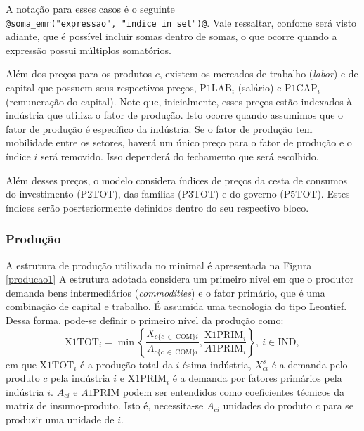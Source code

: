 \documentclass[12pt,twoside]{article}
\begin{document}
A notação para esses casos é o seguinte
\texttt{@soma\_emr("expressao",\ "indice\ in\ set")@}. Vale ressaltar,
confome será visto adiante, que é possível incluir somas dentro de
somas, o que ocorre quando a expressão possui múltiplos somatórios.

Além dos preços para os produtos \(c\), existem os mercados de trabalho
(\emph{labor}) e de capital que possuem seus respectivos preços,
\(\text{P1LAB}_i\) (salário) e \(\text{P1CAP}_i\) (remuneração do
capital). Note que, inicialmente, esses preços estão indexados à
indústria que utiliza o fator de produção. Isto ocorre quando assumimos
que o fator de produção é específico da indústria. Se o fator de
produção tem mobilidade entre os setores, haverá um único preço para o
fator de produção e o índice \(i\) será removido. Isso dependerá do
fechamento que será escolhido.

Além desses preços, o modelo considera índices de preços da cesta de
consumos do investimento (P2TOT), das famílias (P3TOT) e do governo
(P5TOT). Estes índices serão posrteriormente definidos dentro do seu
respectivo bloco.

\hypertarget{produuxe7uxe3o}{%
\subsubsection{Produção}\label{produuxe7uxe3o}}

A estrutura de produção utilizada no minimal é apresentada na Figura
\ref{producao1} A estrutura adotada considera um primeiro nível em que o
produtor demanda bens intermediários (\emph{commodities}) e o fator
primário, que é uma combinação de capital e trabalho. É assumida uma
tecnologia do tipo Leontief. Dessa forma, pode-se definir o primeiro
nível da produção como: \begin{equation}\label{e_x1tot}
\text{X1TOT}_i = \min\left\{\frac{X_{c \{c~\in~\text{COM}\}i}}{A_{c\{c~\in~ \text{COM}\}i}}, \frac{\text{X1PRIM}_i}{A\text{1PRIM}_{i}}\right\}, ~ i \in \text{IND},
\end{equation} em que \(\text{X1TOT}_i\) é a produção total da
\(i\)-ésima indústria, \(X^s_{ci}\) é a demanda pelo produto \(c\) pela
indústria \(i\) e \(\text{X1PRIM}_i\) é a demanda por fatores primários
pela indústria \(i\). \(A_{ci}\) e \(A\text{1PRIM}\) podem ser
entendidos como coeficientes técnicos da matriz de insumo-produto. Isto
é, necessita-se \(A_{ci}\) unidades do produto \(c\) para se produzir
uma unidade de \(i\).
\end{document}
